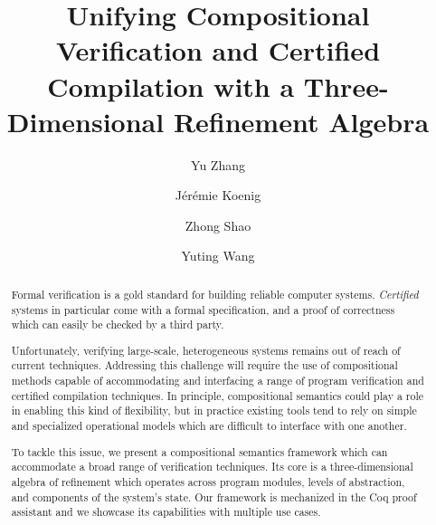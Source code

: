 \documentclass[acmsmall,nonacm]{acmart}
\begin{document}
\theoremstyle{acmdefinition}
\newtheorem{remark}[theorem]{Remark}

\title{Unifying Compositional Verification and Certified Compilation with a Three-Dimensional Refinement Algebra}

\author{Yu Zhang}

\author{Jérémie Koenig}

\author{Zhong Shao}

\author{Yuting Wang}

\begin{abstract} %
Formal verification is a gold standard
for building reliable computer systems.
\emph{Certified} systems in particular
come with a formal specification,
and a proof of correctness
which can easily be checked by a third party.

Unfortunately, verifying large-scale, heterogeneous systems
remains out of reach of current techniques.
Addressing this challenge
will require the use of compositional methods
capable of accommodating and interfacing
a range of program verification and certified compilation techniques.
In principle,
compositional semantics
could play a role in enabling this kind of flexibility, but
in practice
existing tools
tend to rely on
simple and specialized
operational models
which are difficult to interface with one another.

To tackle this issue,
we present a compositional semantics framework
which can accommodate a broad range of verification techniques.
Its core is a three-dimensional algebra of refinement
which operates across program modules,
levels of abstraction, and
components of the system's state.
Our framework is mechanized in the Coq proof assistant
and we showcase its capabilities with multiple use cases.
\end{abstract}
\end{document}
